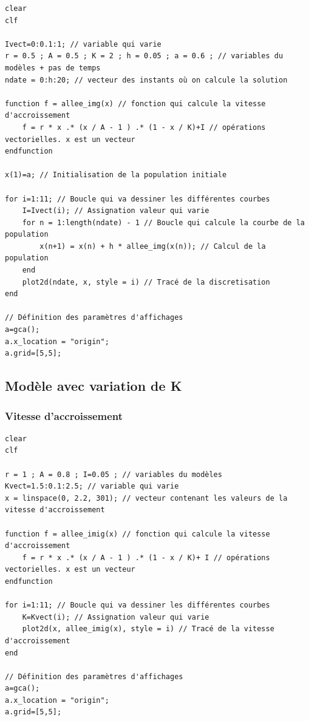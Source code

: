 \documentclass{article}
\begin{document}
\begin{verbatim}
clear
clf

Ivect=0:0.1:1; // variable qui varie
r = 0.5 ; A = 0.5 ; K = 2 ; h = 0.05 ; a = 0.6 ; // variables du modèles + pas de temps
ndate = 0:h:20; // vecteur des instants où on calcule la solution

function f = allee_img(x) // fonction qui calcule la vitesse d'accroissement
    f = r * x .* (x / A - 1 ) .* (1 - x / K)+I // opérations vectorielles. x est un vecteur
endfunction

x(1)=a; // Initialisation de la population initiale

for i=1:11; // Boucle qui va dessiner les différentes courbes
    I=Ivect(i); // Assignation valeur qui varie
    for n = 1:length(ndate) - 1 // Boucle qui calcule la courbe de la population
        x(n+1) = x(n) + h * allee_img(x(n)); // Calcul de la population
    end 
    plot2d(ndate, x, style = i) // Tracé de la discretisation
end

// Définition des paramètres d'affichages
a=gca();
a.x_location = "origin";
a.grid=[5,5];
\end{verbatim}

\subsection{Modèle avec variation de K}

\subsubsection{Vitesse d'accroissement}

\begin{verbatim}
clear
clf

r = 1 ; A = 0.8 ; I=0.05 ; // variables du modèles
Kvect=1.5:0.1:2.5; // variable qui varie
x = linspace(0, 2.2, 301); // vecteur contenant les valeurs de la vitesse d'accroissement

function f = allee_imig(x) // fonction qui calcule la vitesse d'accroissement
    f = r * x .* (x / A - 1 ) .* (1 - x / K)+ I // opérations vectorielles. x est un vecteur
endfunction

for i=1:11; // Boucle qui va dessiner les différentes courbes
    K=Kvect(i); // Assignation valeur qui varie
    plot2d(x, allee_imig(x), style = i) // Tracé de la vitesse d'accroissement
end

// Définition des paramètres d'affichages
a=gca();
a.x_location = "origin";
a.grid=[5,5];
\end{verbatim}
\end{document}
